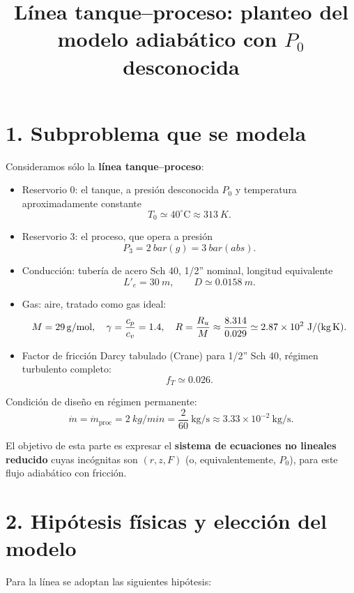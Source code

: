 \documentclass[11pt,a4paper]{article}
\begin{document}
\title{Línea tanque--proceso: planteo del modelo adiabático con \texorpdfstring{$P_0$}{P0} desconocida}
\author{}
\date{}
\maketitle

\section*{1. Subproblema que se modela}

Consideramos sólo la \textbf{línea tanque--proceso}:

\begin{itemize}
  \item Reservorio 0: el tanque, a presión desconocida $P_0$ y temperatura aproximadamente constante
  \[
    T_0 \simeq 40^\circ\text{C} \approx \SI{313}{K}.
  \]
  \item Reservorio 3: el proceso, que opera a presión
  \[
    P_3 = \SI{2}{bar(g)} = \SI{3}{bar(abs)}.
  \]
  \item Conducción: tubería de acero Sch 40, 1/2'' nominal, longitud equivalente
  \[
    L'_e = \SI{30}{m},\qquad D \simeq \SI{0.0158}{m}.
  \]
  \item Gas: aire, tratado como gas ideal:
  \[
    M = \SI{29}{g/mol},\quad
    \gamma = \frac{c_p}{c_v} = 1.4,\quad
    R = \frac{R_u}{M} \approx \frac{8.314}{0.029}\simeq 2.87\times10^2\ \text{J/(kg\,K)}.
  \]
  \item Factor de fricción Darcy tabulado (Crane) para 1/2'' Sch 40, régimen turbulento completo:
  \[
    f_T \simeq 0.026.
  \]
\end{itemize}

Condición de diseño en régimen permanente:
\[
\dot m = \dot m_{\text{proc}} = \SI{2}{kg/min} =
\frac{2}{60}\ \text{kg/s} \approx 3.33\times10^{-2}\ \text{kg/s}.
\]

El objetivo de esta parte es expresar el \textbf{sistema de ecuaciones no lineales reducido} cuyas incógnitas son $(r,z,F)$ (o, equivalentemente, $P_0$), para este flujo adiabático con fricción.

\section*{2. Hipótesis físicas y elección del modelo}

Para la línea se adoptan las siguientes hipótesis:
\end{document}

